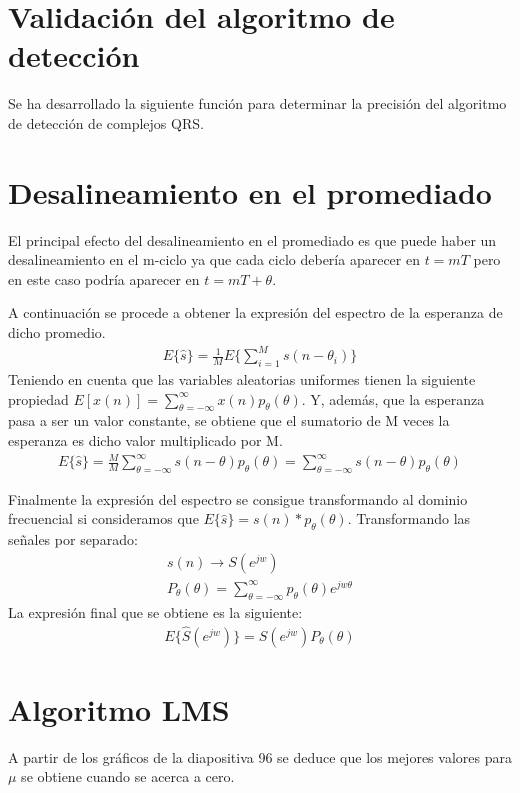 \documentclass[12pt]{article}
\begin{document}
\section{Validación del algoritmo de detección}
Se ha desarrollado la siguiente función para determinar la precisión del algoritmo de detección de complejos QRS.\\



\section{Desalineamiento en el promediado}
El principal efecto del desalineamiento en el promediado es que puede haber un desalineamiento en el m-ciclo ya que cada ciclo debería aparecer en $t=mT$ pero en este caso podría aparecer en $t=mT+\theta$.

A continuación se procede a obtener la expresión del espectro de la esperanza de dicho promedio.
\begin{gather*}
E\{ \hat{s} \} = \frac{1}{M} E\{ \sum_{i=1}^{M}s(n-\theta_i)  \}
\end{gather*}
Teniendo en cuenta que las variables aleatorias uniformes tienen la siguiente propiedad $E[x(n)] = \sum_{\theta = -\infty}^{\infty}x(n)p_{\theta}(\theta)$. Y, además, que la esperanza pasa a ser un valor constante, se obtiene que el sumatorio de M veces la esperanza es dicho valor multiplicado por M.
\begin{gather*}
E\{ \hat{s} \} = \frac{M}{M} \sum_{\theta = -\infty}^{\infty} s(n-\theta)p_{\theta}(\theta) = \sum_{\theta = -\infty}^{\infty} s(n-\theta)p_{\theta}(\theta)
\end{gather*}

Finalmente la expresión del espectro se consigue transformando al dominio frecuencial si consideramos que $E\{ \hat{s} \} = s(n)*p_{\theta}(\theta)$.
Transformando las señales por separado:
\begin{gather*}
s(n) \rightarrow S(e^{jw})\\
P_{\theta}(\theta) = \sum_{\theta = -\infty}^{\infty}p_{\theta}(\theta)e^{jw\theta}
\end{gather*}
La expresión final que se obtiene es la siguiente:
\begin{gather*}
E\{ \hat{S}(e^{jw}) \}=S(e^{jw})P_{\theta}(\theta)
\end{gather*}

\section{Algoritmo LMS}
A partir de los gráficos de la diapositiva 96 se deduce que los mejores valores para $\mu$ se obtiene cuando se acerca a cero.
\end{document}
